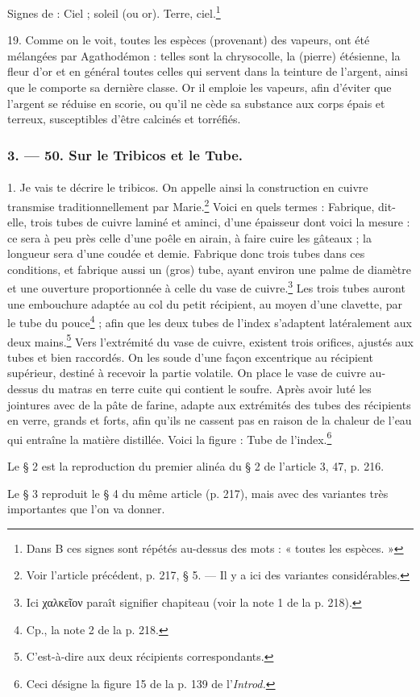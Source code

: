 \documentclass[a4paper, 11pt, oneside, polutonikogreek, french]{article}
\begin{document}
Signes de : Ciel ; soleil (ou or). Terre, ciel.\footnote{Dans B ces signes sont répétés au-dessus des mots : « toutes les espèces. »}

19. Comme on le voit, toutes les espèces (provenant) des vapeurs, ont été mélangées par Agathodémon : telles sont la chrysocolle, la (pierre) étésienne, la fleur d'or et en général toutes celles qui servent dans la teinture de l'argent, ainsi que le comporte sa dernière classe. Or il emploie les vapeurs, afin d'éviter que l'argent se réduise en scorie, ou qu'il ne cède sa substance aux corps épais et terreux, susceptibles d'être calcinés et torréfiés.

\bigskip
\centerline{\EightStarTaper}
\centerline{\EightStarTaper\EightStarTaper}
\bigskip

\subsubsection{3. --- 50. Sur le Tribicos et le Tube.}
\paragraph{}
1. Je vais te décrire le tribicos. On appelle ainsi la construction en cuivre transmise traditionnellement par Marie.\footnote{Voir l'article précédent, p. 217, § 5. --- Il y a ici des variantes considérables.} Voici en quels termes : Fabrique, dit-elle, trois tubes de cuivre laminé et aminci, d'une épaisseur dont voici la mesure : ce sera à peu près celle d'une poêle en airain, à faire cuire les gâteaux ; la longueur sera d'une coudée et demie. Fabrique donc trois tubes dans ces conditions, et fabrique aussi un (gros) tube, ayant environ une palme de diamètre et une ouverture proportionnée à celle du vase de cuivre.\footnote{Ici χαλκεῖον paraît signifier chapiteau (voir la note 1 de la p. 218).} Les trois tubes auront une embouchure adaptée au col du petit récipient, au moyen d'une clavette, par le tube du pouce\footnote{Cp., la note 2 de la p. 218.} ; afin que les deux tubes de l'index s'adaptent latéralement aux deux mains.\footnote{C'est-à-dire aux deux récipients correspondants.} Vers l'extrémité du vase de cuivre, existent trois orifices, ajustés aux tubes et bien raccordés. On les soude d'une façon excentrique au récipient supérieur, destiné à recevoir la partie volatile. On place le vase de cuivre au-dessus du matras en terre cuite qui contient le soufre. Après avoir luté les jointures avec de la pâte de farine, adapte aux extrémités des tubes des récipients en verre, grands et forts, afin qu'ils ne cassent pas en raison de la chaleur de l'eau qui entraîne la matière distillée. Voici la figure : Tube de l'index.\footnote{Ceci désigne la figure 15 de la p. 139 de l'\emph{Introd.}}
\begin{center}
Le § 2 est la reproduction du premier alinéa du § 2 de l'article 3, 47, p. 216.

Le § 3 reproduit le § 4 du même article (p. 217), mais avec des variantes très importantes que l'on va donner.
\end{center}
\end{document}
